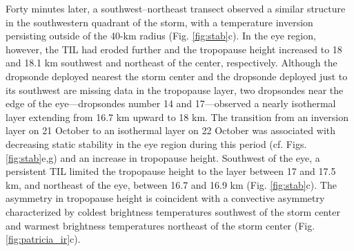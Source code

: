 Forty minutes later, a southwest–northeast transect observed a similar structure in the southwestern quadrant of the storm, with a temperature inversion persisting outside of the 40-km radius (Fig. \ref{fig:stab}c).
In the eye region, however, the TIL had eroded further and the tropopause height increased to 18 and 18.1 km southwest and northeast of the center, respectively.
Although the dropsonde deployed nearest the storm center and the dropsonde deployed just to its southwest are missing data in the tropopause layer, two dropsondes near the edge of the eye---dropsondes number 14 and 17---observed a nearly isothermal layer extending from 16.7 km upward to 18 km.
The transition from an inversion layer on 21 October to an isothermal layer on 22 October was associated with decreasing static stability in the eye region during this period (cf. Figs. \ref{fig:stab}e,g) and an increase in tropopause height.
Southwest of the eye, a persistent TIL limited the tropopause height to the layer between 17 and 17.5 km, and northeast of the eye, between 16.7 and 16.9 km (Fig. \ref{fig:stab}c).
The asymmetry in tropopause height is coincident with a convective asymmetry characterized by coldest brightness temperatures southwest of the storm center and warmest brightness temperatures northeast of the storm center (Fig. \ref{fig:patricia_ir}c).

